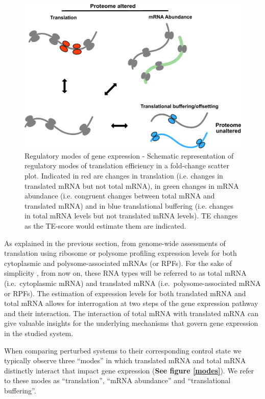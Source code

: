 \documentclass[12pt,openany]{book}
\begin{document}
\begin{figure}
  \includegraphics{./figures/geneModes_MRNA.pdf}
  \caption{Regulatory modes of gene expression - Schematic representation of regulatory modes of translation efficiency in a fold-change scatter plot. Indicated in red are changes in translation (i.e. changes in translated mRNA but not total mRNA), in green changes in mRNA abundance (i.e. congruent changes between total mRNA and translated mRNA) and in blue translational buffering (i.e. changes in total mRNA levels but not translated mRNA levels). TE changes as the TE-score would estimate them are indicated.\label{fig:modes}}
\end{figure}

As explained in the previous section, from genome-wide assessments of
translation using ribosome or polysome profiling expression levels for
both cytoplasmic and polysome-associated mRNAs (or RPFs). For the sake
of simplicity , from now on, these RNA types will be referred to as
total mRNA (i.e.~cytoplasmic mRNA) and translated mRNA
(i.e.~polysome-associated mRNA or RPFs). The estimation of expression
levels for both translated mRNA and total mRNA allows for interrogation
at two steps of the gene expression pathway and their interaction. The
interaction of total mRNA with translated mRNA can give valuable
insights for the underlying mechanisms that govern gene expression in
the studied system.

When comparing perturbed systems to their corresponding control state we
typically observe three ``modes'' in which translated mRNA and total
mRNA distinctly interact that impact gene expression (\textbf{See figure
\ref{modes}}). We refer to these modes as ``translation'', ``mRNA
abundance'' and ``translational buffering''.
\end{document}

